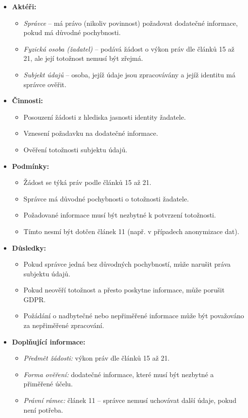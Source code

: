 \begin{itemize}
\item \textbf{Aktéři:}
\begin{itemize}
\item \textit{Správce} – má právo (nikoliv povinnost) požadovat dodatečné informace, pokud má důvodné pochybnosti.
\item \textit{Fyzická osoba (žadatel)} – podává žádost o výkon práv dle článků 15 až 21, ale její totožnost nemusí být zřejmá.
\item \textit{Subjekt údajů} – osoba, jejíž údaje jsou zpracovávány a jejíž identitu má správce ověřit.
\end{itemize}

\item \textbf{Činnosti:}
\begin{itemize}
\item Posouzení žádosti z hlediska jasnosti identity žadatele.
\item Vznesení požadavku na dodatečné informace.
\item Ověření totožnosti subjektu údajů.
\end{itemize}

\item \textbf{Podmínky:}
\begin{itemize}
\item Žádost se týká práv podle článků 15 až 21.
\item Správce má důvodné pochybnosti o totožnosti žadatele.
\item Požadované informace musí být nezbytné k potvrzení totožnosti.
\item Tímto nesmí být dotčen článek 11 (např. v případech anonymizace dat).
\end{itemize}

\item \textbf{Důsledky:}
\begin{itemize}
\item Pokud správce jedná bez důvodných pochybností, může narušit práva subjektu údajů.
\item Pokud neověří totožnost a přesto poskytne informace, může porušit GDPR.
\item Požádání o nadbytečné nebo nepřiměřené informace může být považováno za nepřiměřené zpracování.
\end{itemize}

\item \textbf{Doplňující informace:}
\begin{itemize}
\item \textit{Předmět žádosti:} výkon práv dle článků 15 až 21.
\item \textit{Forma ověření:} dodatečné informace, které musí být nezbytné a přiměřené účelu.
\item \textit{Právní rámec:} článek 11 – správce nemusí uchovávat další údaje, pokud není potřeba.
\end{itemize}
\end{itemize}

